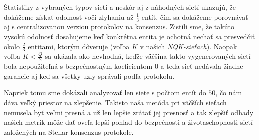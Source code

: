 Štatistiky z vybraných typov sietí a neskôr aj z náhodných sietí ukazujú, že
dokážeme získať odolnosť voči zlyhaniu až $\frac{1}{3}$ entít, čím sa dokážeme
porovnávať aj s centralizovanou verziou protokolov na konsenzus. Zistili sme,
že takúto vysokú odolnosť dosahujeme keď konkrétna entita je ochotná nechať sa
presvedčiť okolo $\frac{2}{3}$ entitami, ktorým dôveruje (voľba $K$ v našich
\textit{NQK-sieťach}). Naopak voľba $K < \frac{Q}{2}$ sa ukázala ako nevhodná,
keďže väčšina takto vygenerovaných sietí bola nepoužiteľná s bezpečnostným
koeficientom 0 a teda sieť nedávala žiadne garancie aj keď sa všetky uzly
správali podľa protokolu.

Napriek tomu sme dokázali analyzovať len siete s počtom entít do $50$, čo
nám dáva veľký priestor na zlepšenie. Takisto naša metóda pri väčších sieťach
nemusela byť veľmi presná a už len lepšie zrátať jej presnosť a tak zlepšiť
odhady našich metrík môže dať oveľa lepší pohľad do bezpečnosti a životaschopnosti
sietí založených na Stellar konsenzus protokole.